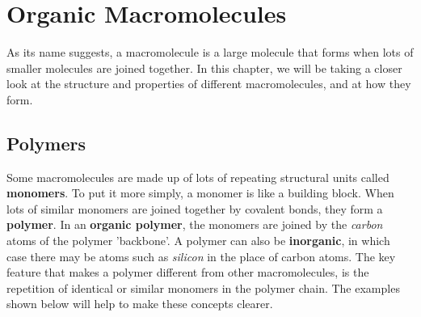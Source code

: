\chapter{Organic Macromolecules}
\label{chap:orgmac}

As its name suggests, a macromolecule is a large molecule that forms when lots of smaller molecules are joined together. In this chapter, we will be taking a closer look at the structure and properties of different macromolecules, and at how they form. 


\section{Polymers}
\label{sec:orgmac:polymers}

Some macromolecules are made up of lots of repeating structural units called \textbf{monomers}. To put it more simply, a monomer is like a building block. When lots of similar monomers are joined together by covalent bonds, they form a \textbf{polymer}. In an \textbf{organic polymer}, the monomers are joined by the \textit{carbon} atoms of the polymer 'backbone'. A polymer can also be \textbf{inorganic}, in which case there may be atoms such as \textit{silicon} in the place of carbon atoms. The key feature that makes a polymer different from other macromolecules, is the repetition of identical or similar monomers in the polymer chain. The examples shown below will help to make these concepts clearer. 



